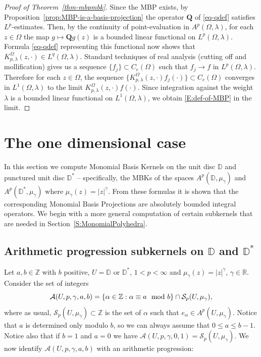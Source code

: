 \documentclass[letterpaper,11pt,reqno]{amsart}
\theoremstyle{plain}
\theoremstyle{definition}
\theoremstyle{remark}
\theoremstyle{remark}
\numberwithin{equation}{section}
\newcommand{\abs}[1]{\left\vert#1\right\vert}
\newcommand{\mug}{{\mu_{\gamma}}}
\newcommand{\ca}{{\mathcal A}}
\newcommand{\cs}{{\mathcal S}}
\newcommand{\D}{{\mathbb D}}
\newcommand{\R}{{\mathbb R}}
\newcommand{\Z}{{\mathbb Z}}
\begin{document}
\begin{proof}[Proof of Theorem~\ref{thm-mbpmbk}]
Since the MBP exists, by Proposition~\ref{prop:MBP-is-a-basis-projection} the operator $\bm{Q}$ of \eqref{eq-qdef} satisfies $L^p$-estimates. 
Then, by the continuity of point-evaluation in $A^p(\Omega,\lambda)$, for each $z \in \Omega$ the map $g \mapsto\bm{Q}g(z)$ is a bounded linear functional on $L^p(\Omega, \lambda)$. 
Formula \eqref{eq-qdef} representing this functional now shows that $K_{p,\lambda}^\Omega(z,\cdot)\in L^q(\Omega, \lambda)$.
Standard techniques of real analysis (cutting off and mollification) gives us a sequence $\{f_j\}\subset C_c(\Omega)$ such that $f_j\to f$ in $L^p(\Omega, \lambda)$. 
Therefore for each $z\in \Omega$, the sequence $\{K^\Omega_{p,\lambda}(z,\cdot)f_j(\cdot) \}\subset C_c(\Omega)$ converges in $L^1(\Omega,\lambda)$ to the limit $K^\Omega_{p,\lambda}(z,\cdot)f(\cdot)$. 
Since integration against the weight $\lambda$ is a bounded linear functional on $L^1(\Omega,\lambda)$, we obtain \eqref{E:def-of-MBP} in the limit.
\end{proof}


\section{The one dimensional case}\label{sec-onedim}
In this section we compute Monomial Basis Kernels on the unit disc $\D$ and punctured unit disc $\D^*$ -- specifically, the MBKs of the spaces $A^p(\D,\mug)$ and $A^p(\D^*,\mug)$ where $\mug(z) = |z|^\gamma$. 
From these formulas it is shown that the corresponding Monomial Basis Projections are absolutely bounded integral operators.  
We begin with a more general computation of certain subkernels that are needed in Section~\ref{S:MonomialPolyhedra}. 

\subsection{Arithmetic progression subkernels on \texorpdfstring{$\D$}{D} and \texorpdfstring{$\D^*$}{Dstar}}\label{SS:MBK-formulas}
Let $a, b \in \Z$ with $b$ positive, $U = \D$ or $\D^*$, $1<p<\infty$ and $\mug(z) = \abs{z}^\gamma$, $\gamma \in \R$.  
Consider the set of integers
\begin{equation}\label{E:arithmetic-progression_A_{a,b}}
\ca(U,p,\gamma,a,b) = \{\alpha\in \Z: \alpha\equiv a \mod b\} \cap \cs_p(U, \mug),
\end{equation}
where as usual, $\cs_p(U,\mug)\subset \Z$ is the set of $\alpha$ such that $e_\alpha \in A^p(U,\mug)$. 
Notice that $a$ is determined only modulo $b$, so we can always assume that $0\leq a \leq b-1$.
Notice also that if $b=1$ and $a=0$ we have $\ca(U,p,\gamma,0,1) =  \cs_p(U, \mug)$.
We now identify $\ca(U,p,\gamma,a,b)$ with an arithmetic progression:
\end{document}
